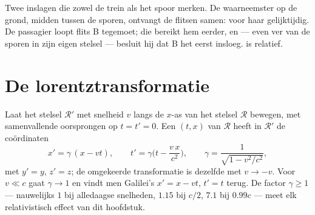 \begin{omfigure}

{\small Twee inslagen die zowel de trein als het spoor merken. De
waarneemster op de grond, midden tussen de sporen, ontvangt de flitsen
samen: voor haar gelijktijdig. De passagier loopt flits B tegemoet; die
bereikt hem eerder, en --- even ver van de sporen in zijn eigen stelsel
--- besluit hij dat B het eerst insloeg.  is relatief.}
\end{omfigure}

\section{De lorentztransformatie}

\begin{theorem}[Lorentztransformatie]\label{thm:b3:relativistic-kinematics:lorentz}
Laat het stelsel $\mathcal R'$ met snelheid $v$ langs de $x$-as van het
stelsel $\mathcal R$ bewegen, met samenvallende oorsprongen op $t = t' = 0$. Een  $(t, x)$ van $\mathcal R$ heeft in $\mathcal R'$ de
coördinaten
\[
x' = \gamma\,(x - vt) , \qquad
t' = \gamma\Big(t - \frac{v\,x}{c^2}\Big) , \qquad
\gamma = \frac{1}{\sqrt{1 - v^2/c^2}} ,
\]
met $y' = y$, $z' = z$; de omgekeerde transformatie is dezelfde met
$v \to -v$. Voor $v \ll c$ gaat $\gamma \to 1$ en vindt men Galilei's
$x' = x - vt$, $t' = t$ terug. De factor $\gamma \ge 1$ --- nauwelijks
$1$ bij alledaagse snelheden, $1.15$ bij $c/2$, $7.1$ bij $0.99c$ ---
meet elk relativistisch effect van dit hoofdstuk.
\end{theorem}

